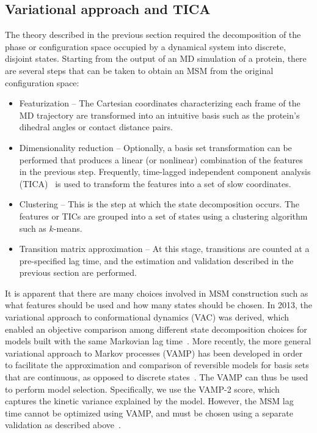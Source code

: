 \documentclass[9pt,tutorial]{livecoms}
\begin{document}
\subsection{Variational approach and TICA}

The theory described in the previous section required the decomposition of the phase or configuration space occupied by a dynamical system into discrete, disjoint states.
Starting from the output of an MD simulation of a protein, there are several steps that can be taken to obtain an MSM from the original configuration space:

\begin{itemize}
	\item Featurization -- The Cartesian coordinates characterizing each frame of the MD trajectory are transformed into an intuitive basis such as the protein's dihedral angles or contact distance pairs.
	\item Dimensionality reduction -- Optionally, a basis set transformation can be performed that produces a linear (or nonlinear) combination of the features in the previous step.
	Frequently, time-lagged independent component analysis (TICA)~\cite{tica,tica3,tica2,kinetic-maps} is used to transform the features into a set of slow coordinates.
	\item Clustering -- This is the step at which the state decomposition occurs.
	The features or TICs are grouped into a set of states using a clustering algorithm such as $k$-means.
	\item Transition matrix approximation -- At this stage, transitions are counted at a pre-specified lag time, and the estimation and validation described in the previous section are performed.
\end{itemize}

It is apparent that there are many choices involved in MSM construction such as what features should be used and how many states should be chosen.
In 2013, the variational approach to conformational dynamics (VAC) was derived,
which enabled an objective comparison among different state decomposition choices for models built with the same Markovian lag time~\cite{noe-vac}.
More recently, the more general variational approach to Markov processes (VAMP) has been developed in order to facilitate the approximation and comparison of reversible models for basis sets that are continuous,
as opposed to discrete states~\cite{vamp-preprint}.
The VAMP can thus be used to perform model selection.
Specifically, we use the VAMP-2 score, which captures the kinetic variance explained by the model.
However, the MSM lag time cannot be optimized using VAMP,
and must be chosen using a separate validation as described above~\cite{husic2017note}.
\end{document}
